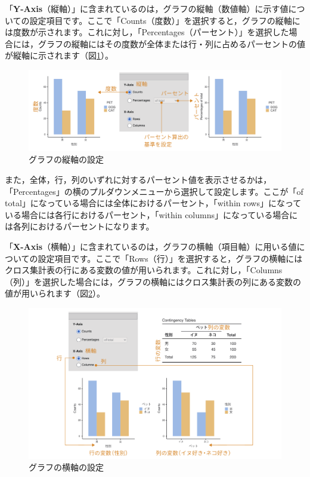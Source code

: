 \documentclass[
  12pt,
  a5jpaper,
  lualatex, ja=standard]{bxjsbook}
\begin{document}
「\textbf{Y-Axis}（縦軸）」に含まれているのは，グラフの縦軸（数値軸）に示す値についての設定項目です。ここで「Counts（度数）」を選択すると，グラフの縦軸には度数が示されます。これに対し，「Percentages（パーセント）」を選択した場合には，グラフの縦軸にはその度数が全体または行・列に占めるパーセントの値が縦軸に示されます（図\ref{fig:frequencies-chisq-plots-bar-percentage}）。

\begin{figure}[!ht]

{\centering \includegraphics[width=1\linewidth]{images/frequencies/chisq-plots-bar-percentage} 

}

\caption{グラフの縦軸の設定}\label{fig:frequencies-chisq-plots-bar-percentage}
\end{figure}

また，全体，行，列のいずれに対するパーセント値を表示させるかは，「Percentages」の横のプルダウンメニューから選択して設定します。ここが「of total」になっている場合には全体におけるパーセント，「within rows」になっている場合には各行におけるパーセント，「within columns」になっている場合には各列におけるパーセントになります。

「\textbf{X-Axis}（横軸）」に含まれているのは，グラフの横軸（項目軸）に用いる値についての設定項目です。ここで「Rows（行）」を選択すると，グラフの横軸にはクロス集計表の行にある変数の値が用いられます。これに対し，「Columns（列）」を選択した場合には，グラフの横軸にはクロス集計表の列にある変数の値が用いられます（図\ref{fig:frequencies-chisq-plots-bar-xaxis}）。

\begin{figure}[!ht]

{\centering \includegraphics[width=1\linewidth]{images/frequencies/chisq-plots-bar-xaxis} 

}

\caption{グラフの横軸の設定}\label{fig:frequencies-chisq-plots-bar-xaxis}
\end{figure}
\end{document}
